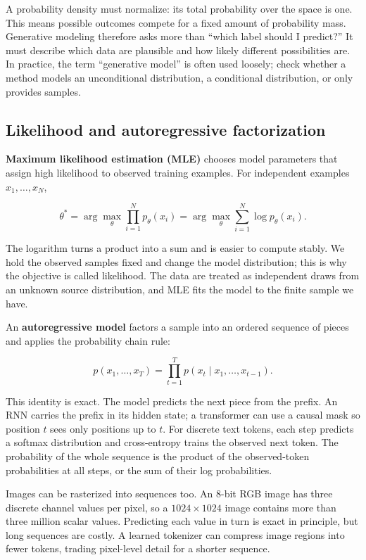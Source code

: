 A probability density must normalize: its total probability over the space is one. This means possible outcomes compete for a fixed amount of probability mass. Generative modeling therefore asks more than ``which label should I predict?'' It must describe which data are plausible and how likely different possibilities are. In practice, the term ``generative model'' is often used loosely; check whether a method models an unconditional distribution, a conditional distribution, or only provides samples.

\subsection{Likelihood and autoregressive factorization}\label{04-visual-computing-ii-ch031-likelihood-and-autoregressive-factorization}

\textbf{Maximum likelihood estimation (MLE)} chooses model parameters that assign high likelihood to observed training examples. For independent examples \(x_1,\ldots,x_N\),

\[
\theta^*=\arg\max_\theta \prod_{i=1}^{N}p_\theta(x_i)
=\arg\max_\theta \sum_{i=1}^{N}\log p_\theta(x_i).
\]

The logarithm turns a product into a sum and is easier to compute stably. We hold the observed samples fixed and change the model distribution; this is why the objective is called likelihood. The data are treated as independent draws from an unknown source distribution, and MLE fits the model to the finite sample we have.

An \textbf{autoregressive model} factors a sample into an ordered sequence of pieces and applies the probability chain rule:

\[
p(x_1,\ldots,x_T)=\prod_{t=1}^{T}p(x_t\mid x_1,\ldots,x_{t-1}).
\]

This identity is exact. The model predicts the next piece from the prefix. An RNN carries the prefix in its hidden state; a transformer can use a causal mask so position \(t\) sees only positions up to \(t\). For discrete text tokens, each step predicts a softmax distribution and cross-entropy trains the observed next token. The probability of the whole sequence is the product of the observed-token probabilities at all steps, or the sum of their log probabilities.

Images can be rasterized into sequences too. An 8-bit RGB image has three discrete channel values per pixel, so a \(1024\times1024\) image contains more than three million scalar values. Predicting each value in turn is exact in principle, but long sequences are costly. A learned tokenizer can compress image regions into fewer tokens, trading pixel-level detail for a shorter sequence.

